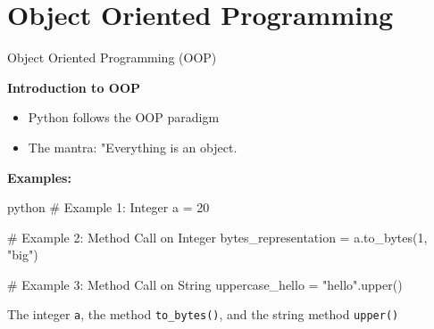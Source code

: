 \documentclass[
	11pt, 
]{beamer}
\begin{document}
\section{Object Oriented Programming}
\begin{frame}[fragile]{Object Oriented Programming (OOP)}

\begin{block}{\textbf{Introduction to OOP}}
    \begin{itemize}
        \item Python follows the OOP paradigm
        \item The mantra: "Everything is an object.
    \end{itemize}
\end{block}

\textbf{Examples:}

\begin{mintedbox}{python}
# Example 1: Integer
a = 20

# Example 2: Method Call on Integer
bytes_representation = a.to_bytes(1, "big")

# Example 3: Method Call on String
uppercase_hello = "hello".upper()
\end{mintedbox}

The integer \texttt{a}, the method \texttt{to\_bytes()}, and the string method \texttt{upper()}


\end{frame}

\end{document}
